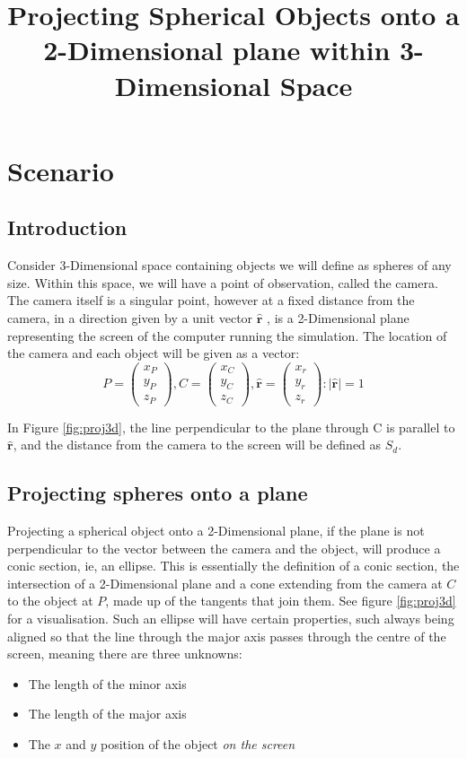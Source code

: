 \documentclass{article}
\title{Projecting Spherical Objects onto a 2-Dimensional plane within 3-Dimensional Space}
\date{}
\newcommand\dd{{2-Dimensional}\xspace}
\newcommand\ddd{{3-Dimensional}\xspace}
\newcommand\ru{\hat{\mathbf{r}}\xspace}
\begin{document}
\maketitle
\tableofcontents
\section{Scenario}

	\subsection{Introduction}
		Consider \ddd space containing objects we will define as spheres of any size. Within this space, we will have a point of
		observation, called the camera. The camera itself is a singular point, however at a fixed distance from the camera, in a direction given by a
		unit vector $\ru$ , is a \dd plane
		representing the screen of the computer running the simulation. The location of the camera and each object will be given as a vector:
		$$P = \begin{pmatrix}x_P\\y_P\\z_P\end{pmatrix}, C = \begin{pmatrix}x_C\\y_C\\z_C\end{pmatrix}, \hat{\mathbf{r}} = \begin{pmatrix}x_r\\y_r\\z_r\end{pmatrix}:|\ru|=1$$


		In Figure \ref{fig:proj3d}, the line perpendicular to the plane through C is parallel to $\ru$, and the distance from the camera to the screen will be
		defined as $S_d$.
	\subsection{Projecting spheres onto a plane}
		Projecting a spherical object onto a \dd plane, if the plane is not perpendicular to the vector between the camera and the object, will produce a conic section, ie, an ellipse. This is essentially the definition of a conic section, the intersection of a \dd plane and a cone extending from the camera at $C$ to the object at $P$, made up of the tangents that join them.
		See figure \ref{fig:proj3d} for a visualisation.
		Such an ellipse will have certain properties, such always being aligned so that the line through the major axis passes through the centre of the screen, meaning there are three unknowns:
	\begin{itemize}
		\item The length of the minor axis
		\item The length of the major axis
		\item The $x$ and $y$ position of the object \textit{on the screen}
	\end{itemize}
\end{document}
